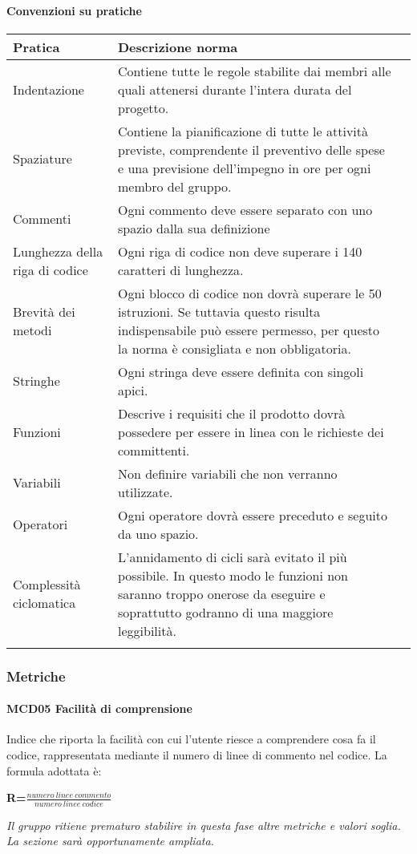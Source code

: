 \paragraph{Convenzioni su pratiche}
{
	\setlength{\freewidth}{\dimexpr\textwidth-0\tabcolsep}
	\renewcommand{\arraystretch}{1.5}
	\setlength{\aboverulesep}{0pt}
	\setlength{\belowrulesep}{0pt}
	\begin{longtable}{L{.210\freewidth} L{.6\freewidth} L{.080\freewidth}}
		\toprule 
		\textbf{Pratica} & \textbf{Descrizione norma} \\
		\toprule
		\endhead		
		Indentazione & Contiene tutte le regole stabilite dai membri alle quali attenersi durante l'intera durata del progetto. \\ 
		Spaziature & Contiene la pianificazione di tutte le attività previste, comprendente il preventivo delle spese e una previsione dell'impegno in ore per ogni membro del gruppo.  \\
		Commenti & Ogni commento deve essere separato con uno spazio dalla sua definizione \\ 
		Lunghezza della riga di codice & Ogni riga di codice non deve superare i 140 caratteri di lunghezza. \\
		Brevità dei metodi & Ogni blocco di codice non dovrà superare le 50 istruzioni. Se tuttavia questo risulta indispensabile può essere permesso, per questo la norma è consigliata e non obbligatoria.\\ 	
		Stringhe & Ogni stringa deve essere definita con singoli apici. \\
		Funzioni & Descrive i requisiti che il prodotto dovrà possedere per essere in linea con le richieste dei committenti.\\ 	
		Variabili & Non definire variabili che non verranno utilizzate.\\ 	
		Operatori & Ogni operatore dovrà essere preceduto e seguito da uno spazio.\\ 	
		Complessità ciclomatica & L'annidamento di cicli sarà evitato il più possibile. In questo modo le funzioni non saranno troppo onerose da eseguire e soprattutto godranno di una maggiore leggibilità. \\  			
		\bottomrule
		\hiderowcolors
	\end{longtable}
}
\subsubsection{Metriche}
\paragraph{MCD05 Facilità di comprensione}
Indice che riporta la facilità con cui l'utente riesce a comprendere cosa fa il codice, rappresentata mediante il numero di linee di commento nel codice.
La formula adottata è:\newline
\centerline{\textbf{R=$\frac{numero\ linee\ commento}{numero\ linee\ codice}$}}
\textit{Il gruppo ritiene prematuro stabilire in questa fase altre metriche e valori soglia. La sezione sarà opportunamente ampliata.}
